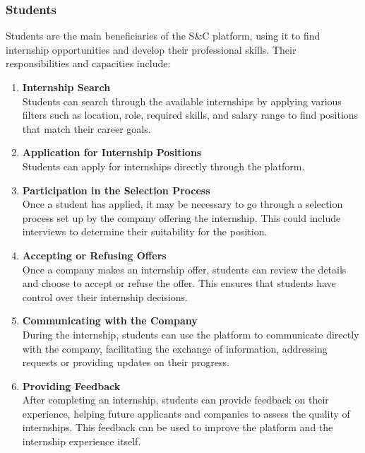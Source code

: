     \subsubsection{Students}
    Students are the main beneficiaries of the S\&C platform, using it to find internship opportunities and develop their professional skills. Their responsibilities and capacities include:
    \begin{enumerate}[label=\textbullet, itemsep=0em]
        \item \textbf{Internship Search}
        \\ Students can search through the available internships by applying various filters such as location, role, required skills, and salary range to find positions that match their career goals.
        
        \item \textbf{Application for Internship Positions}
        \\ Students can apply for internships directly through the platform.

        \item \textbf{Participation in the Selection Process}
        \\ Once a student has applied, it may be necessary to go through a selection process set up by the company offering the internship. This could include interviews to determine their suitability for the position.

        \item \textbf{Accepting or Refusing Offers}
        \\ Once a company makes an internship offer, students can review the details and choose to accept or refuse the offer. This ensures that students have control over their internship decisions.

        \item \textbf{Communicating with the Company}
        \\ During the internship, students can use the platform to communicate directly with the company, facilitating the exchange of information, addressing requests or providing updates on their progress.
        
        \item \textbf{Providing Feedback}
        \\ After completing an internship, students can provide feedback on their experience, helping future applicants and companies to assess the quality of internships. This feedback can be used to improve the platform and the internship experience itself.
    \end{enumerate}
    
